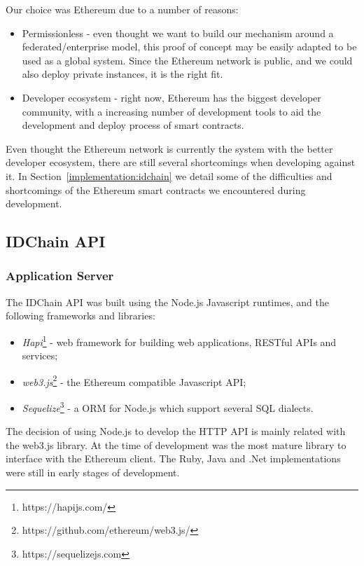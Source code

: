 Our choice was Ethereum due to a number of reasons:

\begin{itemize}
	\item Permissionless - even thought we want to build our mechanism around a federated/enterprise model, this proof of concept may be easily adapted to be used as a global system.
  Since the Ethereum network is public, and we could also deploy private instances, it is the right fit.
	\item Developer ecosystem - right now, Ethereum has the biggest developer community, with a increasing number of development tools to aid the development and deploy process of smart contracts.
\end{itemize}


Even thought the Ethereum network is currently the system with the better developer ecosystem, there are still several shortcomings when developing against it.
In Section~\ref{implementation:idchain} we detail some of the difficulties and shortcomings of the Ethereum smart contracts we encountered during development.

\subsection{IDChain API}

\subsubsection{Application Server}

The IDChain API was built using the Node.js Javascript runtimes, and the following frameworks and libraries:

\begin{itemize}
  \item \textit{Hapi}\footnote{https://hapijs.com/} - web framework for building web applications, RESTful APIs and services;
  \item \textit{web3.js}\footnote{https://github.com/ethereum/web3.js/} - the Ethereum compatible Javascript API;
  \item \textit{Sequelize}\footnote{https://sequelizejs.com} - a \ac{ORM} for Node.js which support several SQL dialects.
\end{itemize}

The decision of using Node.js to develop the HTTP API is mainly related with the web3.js library.
At the time of development was the most mature library to interface with the Ethereum client.
The Ruby, Java and .Net implementations were still in early stages of development.

